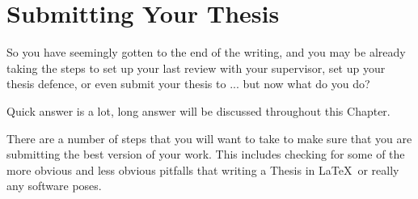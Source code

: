\chapter{Submitting Your Thesis}
	So you have seemingly gotten to the end of the writing, and you may be already taking the steps to set up your last review with your supervisor, set up your thesis defence, or even submit your thesis to \Fac... but now what do you do?
	
	Quick answer is a lot, long answer will be discussed throughout this Chapter.
	
	There are a number of steps that you will want to take to make sure that you are submitting the best version of your work.
	This includes checking for some of the more obvious and less obvious pitfalls that writing a Thesis in \LaTeX\ or really any software poses.